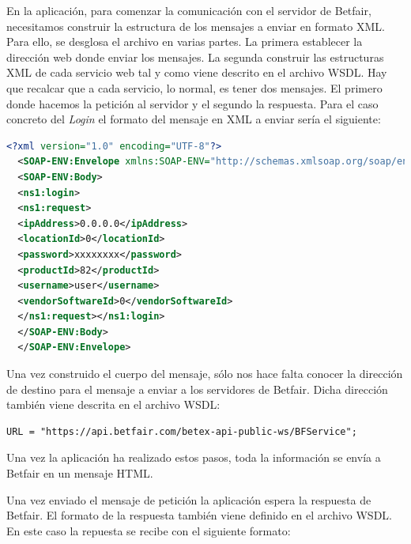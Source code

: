    En la aplicación, para comenzar la comunicación con el servidor de Betfair, necesitamos construir la estructura de los mensajes a enviar en formato XML. Para ello, se desglosa el archivo en varias partes. La primera establecer la dirección web donde enviar los mensajes. La segunda construir las estructuras XML de cada servicio web tal y como viene descrito en el archivo WSDL. Hay que recalcar que a cada servicio, lo normal, es tener dos mensajes. El primero donde hacemos la petición al servidor y el segundo la respuesta. Para el caso concreto del \emph{Login} el formato del mensaje en XML a enviar sería el siguiente:
 
\begin{lstlisting}[frame=single, language=xml,basicstyle=\small, keywordstyle = \color{blue}]
  <?xml version="1.0" encoding="UTF-8"?>
  <SOAP-ENV:Envelope xmlns:SOAP-ENV="http://schemas.xmlsoap.org/soap/envelope/" xmlns:SOAP-ENC="http://schemas.xmlsoap.org/soap/encoding/" xmlns:xsi="http://www.w3.org/2001/XMLSchema-instance" xmlns:xsd="http://www.w3.org/2001/XMLSchema" xmlns:ns2="http://www.betfair.com/publicapi/types/global/v3/" xmlns:ns1="http://www.betfair.com/publicapi/v3/BFGlobalService/">
  <SOAP-ENV:Body>
  <ns1:login>
  <ns1:request>
  <ipAddress>0.0.0.0</ipAddress>
  <locationId>0</locationId>
  <password>xxxxxxxx</password>
  <productId>82</productId>
  <username>user</username>
  <vendorSoftwareId>0</vendorSoftwareId>
  </ns1:request></ns1:login>
  </SOAP-ENV:Body>
  </SOAP-ENV:Envelope> 
 \end{lstlisting}
 
  Una vez construido el cuerpo del mensaje, sólo nos hace falta conocer la dirección de destino para el mensaje a enviar a los servidores de Betfair. Dicha dirección también viene descrita en el archivo WSDL:
  
\begin{lstlisting}[frame=single, language=xml,basicstyle=\small, keywordstyle = \color{blue}] 
  	URL = "https://api.betfair.com/betex-api-public-ws/BFService";
\end{lstlisting}

  Una vez la aplicación ha realizado estos pasos, toda la información se envía a Betfair en un mensaje HTML. 
  
  Una vez enviado el mensaje de petición la aplicación espera la respuesta de Betfair. El formato de la respuesta también viene definido en el archivo WSDL. En este caso la repuesta se recibe con el siguiente formato:

